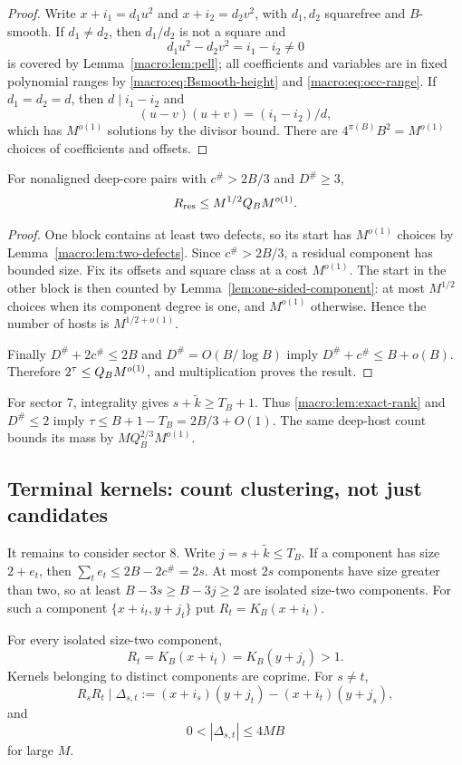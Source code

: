 \begin{proof}
Write
$x+i_1=d_1u^2$ and $x+i_2=d_2v^2$, with $d_1,d_2$ squarefree and
$B$-smooth.  If $d_1\neq d_2$, then $d_1/d_2$ is not a square and
\[
 d_1u^2-d_2v^2=i_1-i_2\neq0
\]
is covered by Lemma~\ref{macro:lem:pell}; all coefficients and variables are
in fixed polynomial ranges by \eqref{macro:eq:Bsmooth-height} and
\eqref{macro:eq:occ-range}.  If $d_1=d_2=d$, then $d\mid i_1-i_2$ and
\[
 (u-v)(u+v)=(i_1-i_2)/d,
\]
which has $M^{o(1)}$ solutions by the divisor bound.  There are
$4^{\pi(B)}B^2=M^{o(1)}$ choices of coefficients and offsets.
\end{proof}
\begin{proposition}[Sector 6]\label{macro:prop:sector6}
For nonaligned deep-core pairs with $c^\#>2B/3$ and $D^\#\geq3$,
\[
 R_{\rm res}\leq M^{1/2}Q_B M^{o(1)}.
\]
\end{proposition}

\begin{proof}
One block contains at least two defects, so its start has
$M^{o(1)}$ choices by Lemma~\ref{macro:lem:two-defects}.  Since
$c^\#>2B/3$, a residual component has bounded size.  Fix its offsets
and square class at a cost $M^{o(1)}$.  The start in the other block is
then counted by Lemma~\ref{lem:one-sided-component}: at most $M^{1/2}$ choices
when its component degree is one, and $M^{o(1)}$ otherwise.  Hence the
number of hosts is $M^{1/2+o(1)}$.

Finally $D^\#+2c^\#\leq2B$ and
$D^\#=O(B/\log B)$ imply
$D^\#+c^\#\leq B+o(B)$.  Therefore
$2^\tau\leq Q_B M^{o(1)}$, and multiplication proves the result.
\end{proof}
For sector 7, integrality gives $s+\widetilde k\ge T_B+1$.
Thus \eqref{macro:lem:exact-rank} and $D^\#\le2$ imply
$\tau\le B+1-T_B=2B/3+O(1)$. The same deep-host count bounds its mass
by $MQ_B^{2/3}M^{o(1)}$.

\subsection{Terminal kernels: count clustering, not just candidates}
It remains to consider sector 8. Write $j=s+\widetilde k\le T_B$.
If a component has size $2+e_t$, then
$\sum_t e_t\le2B-2c^\#=2s$. At most $2s$ components have size greater
than two, so at least $B-3s\ge B-3j\ge2$ are isolated size-two
components. For such a component $\{x+i_t,y+j_t\}$ put
$R_t=K_B(x+i_t)$.
\begin{lemma}\label{macro:lem:determinant}
For every isolated size-two component,
\[
 R_t=K_B(x+i_t)=K_B(y+j_t)>1.
\]
Kernels belonging to distinct components are coprime.  For $s\neq t$,
\[
 R_sR_t\mid
 \Delta_{s,t}:=(x+i_s)(y+j_t)-(x+i_t)(y+j_s),
\]
and
\[
 0<|\Delta_{s,t}|\leq4MB
\]
for large $M$.
\end{lemma}


